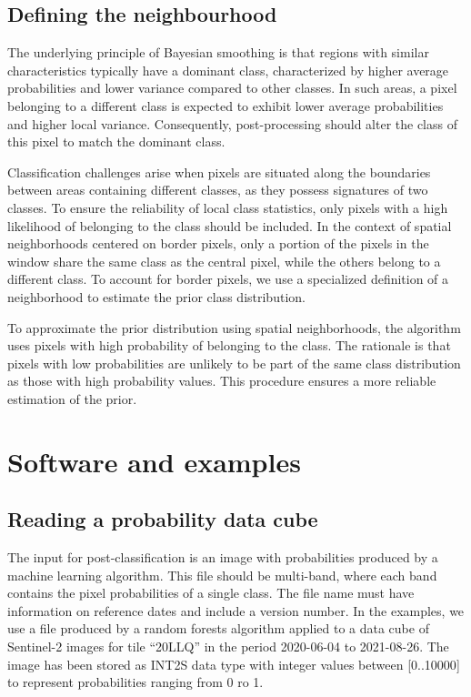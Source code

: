 \documentclass[
  shortnames]{jss}
\begin{document}
\hypertarget{defining-the-neighbourhood}{%
\subsection{Defining the neighbourhood}\label{defining-the-neighbourhood}}

The underlying principle of Bayesian smoothing is that regions with similar characteristics typically have a dominant class, characterized by higher average probabilities and lower variance compared to other classes. In such areas, a pixel belonging to a different class is expected to exhibit lower average probabilities and higher local variance. Consequently, post-processing should alter the class of this pixel to match the dominant class.

Classification challenges arise when pixels are situated along the boundaries between areas containing different classes, as they possess signatures of two classes. To ensure the reliability of local class statistics, only pixels with a high likelihood of belonging to the class should be included. In the context of spatial neighborhoods centered on border pixels, only a portion of the pixels in the window share the same class as the central pixel, while the others belong to a different class. To account for border pixels, we use a specialized definition of a neighborhood to estimate the prior class distribution.

To approximate the prior distribution using spatial neighborhoods, the algorithm uses pixels with high probability of belonging to the class. The rationale is that pixels with low probabilities are unlikely to be part of the same class distribution as those with high probability values. This procedure ensures a more reliable estimation of the prior.

\hypertarget{software-and-examples}{%
\section{Software and examples}\label{software-and-examples}}

\hypertarget{reading-a-probability-data-cube}{%
\subsection{Reading a probability data cube}\label{reading-a-probability-data-cube}}

The input for post-classification is an image with probabilities produced by a machine learning algorithm. This file should be multi-band, where each band contains the pixel probabilities of a single class. The file name must have information on reference dates and include a version number. In the examples, we use a file produced by a random forests algorithm applied to a data cube of Sentinel-2 images for tile ``20LLQ'' in the period 2020-06-04 to 2021-08-26. The image has been stored as INT2S data type with integer values between {[}0..10000{]} to represent probabilities ranging from 0 ro 1.
\end{document}
